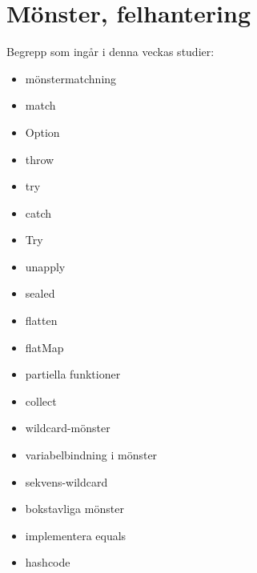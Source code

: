 \chapter{Mönster, felhantering}\label{chapter:W06}
Begrepp som ingår i denna veckas studier:
\begin{itemize}[noitemsep,label={$\square$},leftmargin=*]
\item mönstermatchning
\item match
\item Option
\item throw
\item try
\item catch
\item Try
\item unapply
\item sealed
\item flatten
\item flatMap
\item partiella funktioner
\item collect
\item wildcard-mönster
\item variabelbindning i mönster
\item sekvens-wildcard
\item bokstavliga mönster
\item implementera equals
\item hashcode\end{itemize}
